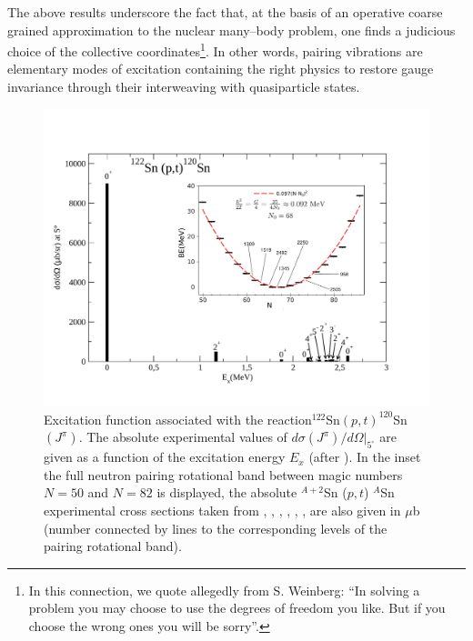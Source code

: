 The above results underscore the fact that, at the basis of an operative coarse grained approximation to the nuclear many--body problem, one finds a judicious choice of the collective coordinates\footnote{In this connection, we quote allegedly from S. Weinberg: ``In solving a problem you may choose to use the degrees of freedom you like. But if you choose the wrong ones you will be sorry''.}. In other words, pairing vibrations are elementary modes of excitation containing the right physics to restore gauge invariance through their interweaving with  quasiparticle states.
  \begin{figure}
  \centerline{\includegraphics*[width=\textwidth,angle=0]{nutshell/figs/ExcitedSn122pt.pdf}}
  \caption{Excitation function associated with the reaction$^{122}$Sn$(p,t)^{120}$Sn$(J^\pi)$. The absolute experimental values of $d\sigma(J^\pi)/d\Omega|_{5^\circ}$ are given as a function of the excitation energy $E_x$ (after \cite{Guazzoni:11}). In the inset the full neutron pairing rotational band between magic numbers $N=50$ and $N=82$ is  displayed, the absolute $^{A+2}$Sn ($p,t$) $^{A}$Sn experimental cross sections taken from \cite{Guazzoni:99}, \cite{Guazzoni:04}, \cite{Guazzoni:06}, \cite{Guazzoni:08}, \cite{Guazzoni:11}, \cite{Guazzoni:12}, are also given in $\mu$b (number connected by lines to the corresponding levels of the pairing rotational band).}\label{fig1.3}
  \end{figure}
